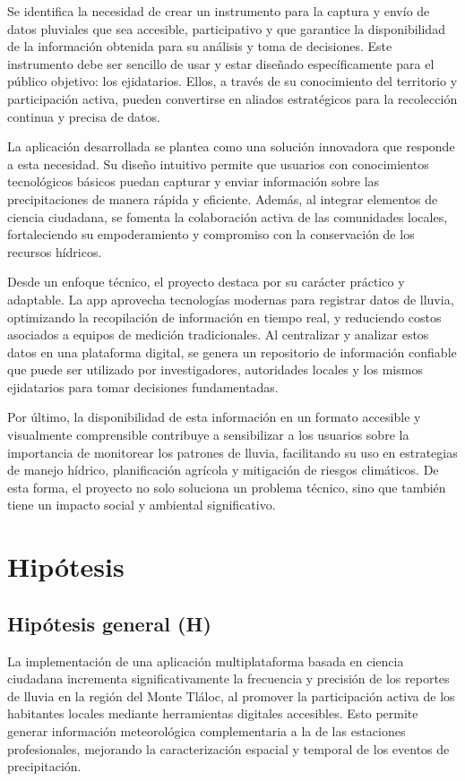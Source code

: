 Se identifica la necesidad de crear un instrumento para la captura y envío de datos pluviales que sea accesible, participativo y que garantice la disponibilidad de la información obtenida para su análisis y toma de decisiones. Este instrumento debe ser sencillo de usar y estar diseñado específicamente para el público objetivo: los ejidatarios. Ellos, a través de su conocimiento del territorio y participación activa, pueden convertirse en aliados estratégicos para la recolección continua y precisa de datos.

La aplicación desarrollada se plantea como una solución innovadora que responde a esta necesidad. Su diseño intuitivo permite que usuarios con conocimientos tecnológicos básicos puedan capturar y enviar información sobre las precipitaciones de manera rápida y eficiente. Además, al integrar elementos de ciencia ciudadana, se fomenta la colaboración activa de las comunidades locales, fortaleciendo su empoderamiento y compromiso con la conservación de los recursos hídricos.

Desde un enfoque técnico, el proyecto destaca por su carácter práctico y adaptable. La app aprovecha tecnologías modernas para registrar datos de lluvia, optimizando la recopilación de información en tiempo real, y reduciendo costos asociados a equipos de medición tradicionales. Al centralizar y analizar estos datos en una plataforma digital, se genera un repositorio de información confiable que puede ser utilizado por investigadores, autoridades locales y los mismos ejidatarios para tomar decisiones fundamentadas. 

Por último, la disponibilidad de esta información en un formato accesible y visualmente comprensible contribuye a sensibilizar a los usuarios sobre la importancia de monitorear los patrones de lluvia, facilitando su uso en estrategias de manejo hídrico, planificación agrícola y mitigación de riesgos climáticos. De esta forma, el proyecto no solo soluciona un problema técnico, sino que también tiene un impacto social y ambiental significativo.


\section{Hipótesis}
\subsection{Hipótesis general (H)}

La implementación de una aplicación multiplataforma basada en ciencia ciudadana incrementa significativamente la frecuencia y precisión de los reportes de lluvia en la región del Monte Tláloc, al promover la participación activa de los habitantes locales mediante herramientas digitales accesibles. Esto permite generar información meteorológica complementaria a la de las estaciones profesionales, mejorando la caracterización espacial y temporal de los eventos de precipitación.


